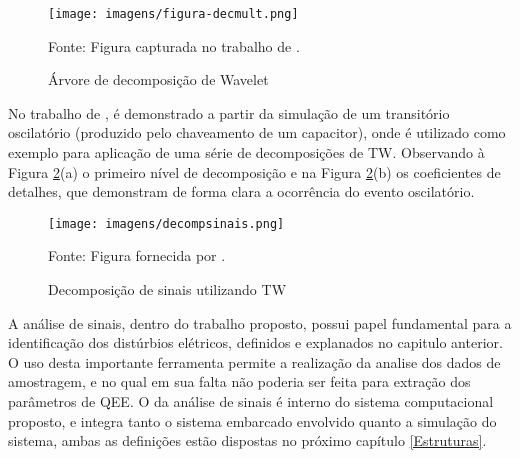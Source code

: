 \begin{figure}[!h]
\begin{center}
\caption{Árvore de decomposição de Wavelet}
\texttt{[image: imagens/figura-decmult.png]}
\par{\small Fonte: Figura capturada no trabalho de \cite{MEN08}.}
\label{fig:decomp}
\end{center}
\end{figure}
\par
No trabalho de \cite{BAC11}, é demonstrado a partir da simulação de um transitório oscilatório (produzido pelo chaveamento de um capacitor), onde é utilizado como exemplo para aplicação de uma série de decomposições de \ac{TW}. Observando à Figura \ref{fig:decomptw}(a) o primeiro nível de decomposição e na Figura \ref{fig:decomptw}(b) os coeficientes de detalhes, que demonstram de forma clara a ocorrência do evento oscilatório.
\begin{figure}[!h]
\begin{center}
\caption{Decomposição de sinais utilizando \ac{TW}}
\texttt{[image: imagens/decompsinais.png]}
\par{\small Fonte: Figura fornecida por \cite{BAC11}.}
\label{fig:decomptw}
\end{center}
\end{figure}
\par
A análise de sinais, dentro do trabalho proposto, possui papel fundamental para a identificação dos distúrbios elétricos, definidos e explanados no capitulo anterior. O uso desta importante ferramenta permite a realização da analise dos dados de amostragem, e no qual em sua falta não poderia ser feita para extração dos parâmetros de \ac{QEE}. O da análise de sinais é interno do sistema computacional proposto, e integra tanto o sistema embarcado envolvido quanto a simulação do sistema, ambas as definições estão dispostas no próximo capítulo \ref{Estruturas}.